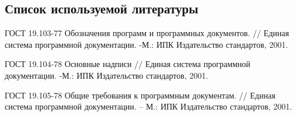 \subsection{Список используемой литературы}
\begin{my_enumerate}

\item
ГОСТ 19.103-77 Обозначения программ и программных документов. // Единая система программной документации. -М.: ИПК Издательство стандартов, 2001. \\

\item
ГОСТ 19.104-78 Основные надписи // Единая система программной документации. -М.: ИПК Издательство стандартов, 2001. \\

\item
ГОСТ 19.105-78 Общие требования к программным документам. // Единая система
программной документации. – М.: ИПК Издательство стандартов, 2001. \\


\end{my_enumerate}

